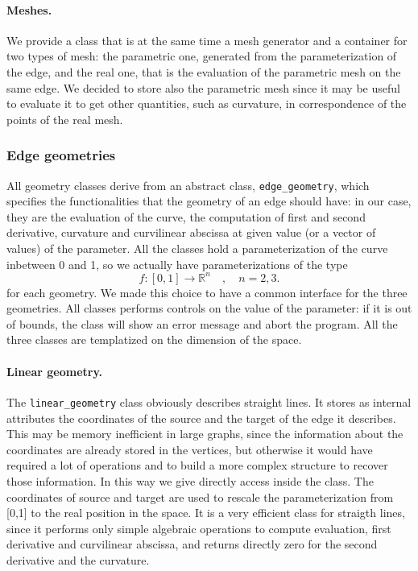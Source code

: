 \documentclass[10pt]{article} %
\newcommand{\classname}[1]{\texttt{#1}}
\begin{document}
	\paragraph{Meshes.} We provide a class that is at the same time a mesh generator and a container for two types of mesh: the parametric one, generated from the parameterization of the edge, and the real one, that is the evaluation of the parametric mesh on the same edge. We decided to store also the parametric mesh since it may be useful to evaluate it to get other quantities, such as curvature, in correspondence of the points of the real mesh.
	
	\subsubsection{Edge geometries}
	All geometry classes derive from an abstract class, \classname{edge\_geometry}, which specifies the functionalities that the geometry of an edge should have: in our case, they are the evaluation of the curve, the computation of first and second derivative, curvature and curvilinear abscissa at given value (or a vector of values) of the parameter. All the classes hold a parameterization of the curve inbetween 0 and 1, so we actually have parameterizations of the type
	\begin{equation*}
	f:[0,1]\rightarrow\mathbb{R}^{n} \quad, \quad n=2,3.
	\end{equation*}
	for each geometry. We made this choice to have a common interface for the three geometries. All classes performs controls on the value of the parameter: if it is out of bounds, the class will show an error message and abort the program. All the three classes are templatized on the dimension of the space.
	\paragraph{Linear geometry.} The \classname{linear\_geometry} class obviously describes straight lines. It stores as internal attributes the coordinates of the source and the target of the edge it describes. This may be memory inefficient in large graphs, since the information about the coordinates are already stored in the vertices, but otherwise it would have required a lot of operations and to build a more complex structure to recover those information. In this way we give directly access inside the class. The coordinates of source and target are used to rescale the parameterization from [0,1] to the real position in the space. It is a very efficient class for straigth lines, since it performs only simple algebraic operations to compute evaluation, first derivative and curvilinear abscissa, and returns directly zero for the second derivative and the curvature.
\end{document}
